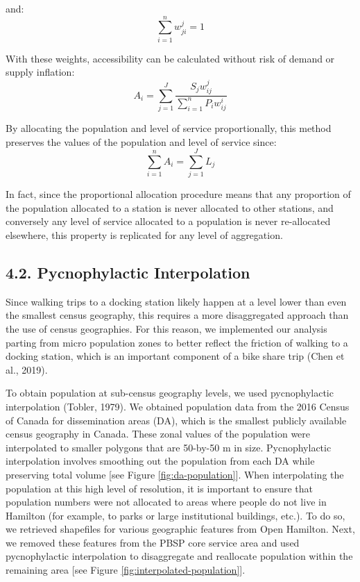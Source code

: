 \documentclass[]{elsarticle} %
\begin{document}
\noindent and: \begin{equation}
\label{eq:weights-2}
\sum_{i = 1}^{n} {w^j_{ji}} = 1
\end{equation}

With these weights, accessibility can be calculated without risk of
demand or supply inflation: \begin{equation}
\label{eq:balanced-accessibility}
A_i = {\sum_{j = 1}^{J} \frac {S_j{w^j_{ij}}}{\sum_{i = 1}^{n} P_i{w^i_{ij}}}}
\end{equation}

By allocating the population and level of service proportionally, this
method preserves the values of the population and level of service
since: \begin{equation}
\label{eq:proportionality}
\sum_{i=1}^n A_i = \sum_{j=1}^J L_j
\end{equation}

In fact, since the proportional allocation procedure means that any
proportion of the population allocated to a station is never allocated
to other stations, and conversely any level of service allocated to a
population is never re-allocated elsewhere, this property is replicated
for any level of aggregation.

\hypertarget{pycnophylactic-interpolation}{%
\subsection{4.2. Pycnophylactic
Interpolation}\label{pycnophylactic-interpolation}}

Since walking trips to a docking station likely happen at a level lower
than even the smallest census geography, this requires a more
disaggregated approach than the use of census geographies. For this
reason, we implemented our analysis parting from micro population zones
to better reflect the friction of walking to a docking station, which is
an important component of a bike share trip (Chen et al., 2019).

To obtain population at sub-census geography levels, we used
pycnophylactic interpolation (Tobler, 1979). We obtained population data
from the 2016 Census of Canada for dissemination areas (DA), which is
the smallest publicly available census geography in Canada. These zonal
values of the population were interpolated to smaller polygons that are
50-by-50 m in size. Pycnophylactic interpolation involves smoothing out
the population from each DA while preserving total volume {[}see Figure
\ref{fig:da-population}{]}. When interpolating the population at this
high level of resolution, it is important to ensure that population
numbers were not allocated to areas where people do not live in Hamilton
(for example, to parks or large institutional buildings, etc.). To do
so, we retrieved shapefiles for various geographic features from Open
Hamilton. Next, we removed these features from the PBSP core service
area and used pycnophylactic interpolation to disaggregate and
reallocate population within the remaining area {[}see Figure
\ref{fig:interpolated-population}{]}.
\end{document}
